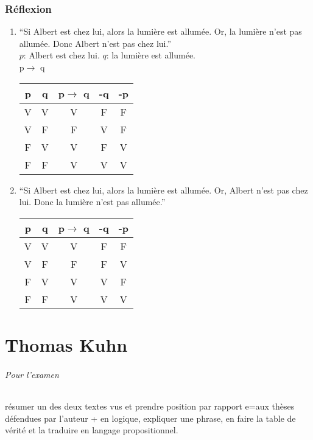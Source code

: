 \documentclass[11pt,a4paper]{article} %
\begin{document}
\section{Réflexion}
\begin{enumerate}
	\item ``Si Albert est chez lui, alors la lumière est allumée. Or, la lumière n'est pas allumée. Donc Albert n'est pas chez lui.''\\
		$p$: Albert est chez lui. $q$: la lumière est allumée.\\
		p$\rightarrow$ q
		\begin{center}
			\begin{tabular}{|c|c||c|c|c|}
				\hline
				p&q& p$\rightarrow$ q&-q&-p\\
				\hline
				V&V&V&F&F\\
				\hline
				V&F&F&V&F\\
				\hline
				F&V&V&F&V\\
				\hline
				F&F&V&V&V\\
				\hline
			\end{tabular}
		\end{center}
	\item ``Si Albert est chez lui, alors la lumière est allumée. Or, Albert n'est pas chez lui. Donc la lumière n'est pas allumée.''
		\begin{center}
			\begin{tabular}{|c|c||c|c|c|}
				\hline
				p&q& p$\rightarrow$ q&-q&-p\\
				\hline
				V&V&V&F&F\\
				\hline
				V&F&F&F&V\\
				\hline
				F&V&V&V&F\\
				\hline
				F&F&V&V&V\\
				\hline
			\end{tabular}
		\end{center}
\end{enumerate}
\part{Thomas Kuhn}
\paragraph{Pour l'examen}
résumer un des deux textes vus et prendre position par rapport e=aux thèses défendues par l'auteur + en logique, expliquer une phrase, en faire la table de vérité et la traduire en langage propositionnel.
\end{document}
